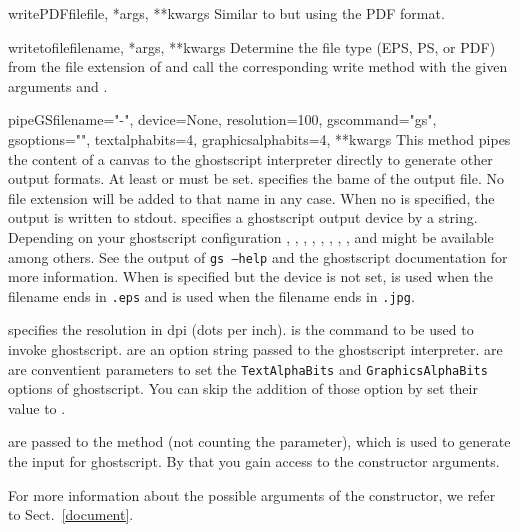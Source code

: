 \begin{methoddesc}{writePDFfile}{file, *args, **kwargs}
  Similar to  but using the PDF format.
\end{methoddesc}

\begin{methoddesc}{writetofile}{filename, *args, **kwargs}
  Determine the file type (EPS, PS, or PDF) from the file extension
  of  and call the corresponding write method with
  the given arguments  and .
\end{methoddesc}

\begin{methoddesc}{pipeGS}{filename="-", device=None, resolution=100,
                           gscommand="gs", gsoptions="",
                           textalphabits=4, graphicsalphabits=4, **kwargs}
  This method pipes the content of a canvas to the ghostscript
  interpreter directly to generate other output formats. At least
   or  must be set.  specifies
  the bame of the output file. No file extension will be added to that
  name in any case. When no  is specified, the output is
  written to stdout.  specifies a ghostscript output
  device by a string. Depending on your ghostscript configuration
  , , , ,
  , , ,
  , and  might be available among
  others. See the output of \texttt{gs --help} and the ghostscript
  documentation for more information. When  is specified
  but the device is not set,  is used when the filename
  ends in \texttt{.eps} and  is used when the filename
  ends in \texttt{.jpg}.

   specifies the resolution in dpi (dots per inch).
   is the command to be used to invoke ghostscript.
   are an option string passed to the ghostscript
  interpreter.  are  are
  conventient parameters to set the \texttt{TextAlphaBits} and
  \texttt{GraphicsAlphaBits} options of ghostscript. You can skip
  the addition of those option by set their value to .

   are passed to the  method (not
  counting the  parameter), which is used to generate the
  input for ghostscript. By that you gain access to the
   constructor arguments.
\end{methoddesc}

For more information about the possible arguments of the
 constructor, we refer to Sect.~\ref{document}.

